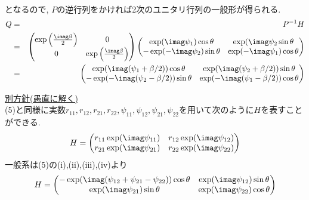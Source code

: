 \begin{enumerate}[(1)]
\begin{eqnarray*}
    \end{eqnarray*}
    となるので, $P$の逆行列をかければ2次のユニタリ行列の一般形が得られる.
    \begin{eqnarray*}
      Q &=& P^{-1}H\\
        &=& \begin{pmatrix}\exp\left(\frac{\imag \beta}{2}\right)&0\\0&\exp\left(\frac{\imag \beta}{2}\right)\end{pmatrix}\begin{pmatrix}\exp(\imag\psi_{1})\cos\theta&\exp(\imag\psi_{2}\sin\theta\\-\exp(-\imag\psi_{2})\sin\theta&\exp(-\imag\psi_{1})\cos\theta\end{pmatrix}\\
        &=& \begin{pmatrix}\exp(\imag(\psi_{1}+\beta/2))\cos\theta&\exp(\imag(\psi_{2}+\beta/2))\sin\theta\\-\exp(-\imag(\psi_{2}-\beta/2))\sin\theta&\exp(-\imag(\psi_{1}-\beta/2))\cos\theta\end{pmatrix}
    \end{eqnarray*}
    \vspace{0.5cm}

    \noindent \underline{別方針(愚直に解く)}\\
    (5)と同様に実数$r_{11},r_{12},r_{21},r_{22},\psi_{11},\psi_{12},\psi_{21},\psi_{22}$を用いて次のように$H$を表すことができる.
    \begin{eqnarray*}
      H=\begin{pmatrix}r_{11}\exp(\imag \psi_{11})&r_{12}\exp(\imag \psi_{12})\\r_{21}\exp(\imag \psi_{21})&r_{22}\exp(\imag \psi_{22})\end{pmatrix}
    \end{eqnarray*}
    一般系は(5)の(i),(ii),(iii),(iv)より
    \begin{eqnarray*}
      H=\begin{pmatrix}-\exp(\imag(\psi_{12}+\psi_{21}-\psi_{22}))\cos\theta&\exp(\imag\psi_{12})\sin\theta\\\exp(\imag \psi_{21})\sin\theta&\exp(\imag\psi_{22})\cos\theta\end{pmatrix}
    \end{eqnarray*}
\end{enumerate}
